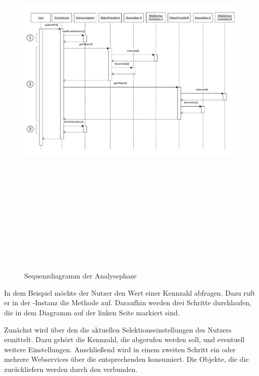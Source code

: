 \begin{onehalfspacing}
\begin{figure}[!ht]
\setlength{\unitlength}{1mm}
\includegraphics[angle=90,height=197mm]{Visio/Analyse-Sequenz-1.pdf}
\caption{Sequenzdiagramm der Analysephase \label{fig:sequenz_analyse}}
\end{figure} 

In dem Beispiel möchte der Nutzer den Wert einer Kennzahl abfragen. Dazu ruft er in der -Instanz die Methode  auf. Daraufhin werden drei Schritte durchlaufen, die in dem Diagramm auf der linken Seite markiert sind. 

Zunächst wird über den  die aktuellen Selektionseinstellungen des Nutzers ermittelt. Dazu gehört die Kennzahl, die abgerufen werden soll, und eventuell weitere Einstellungen. Anschließend wird in einem zweiten Schritt ein oder mehrere Webservices über die entsprechenden  konsumiert. Die Objekte, die die  zurückliefern werden durch den  verbunden.


\end{onehalfspacing}
